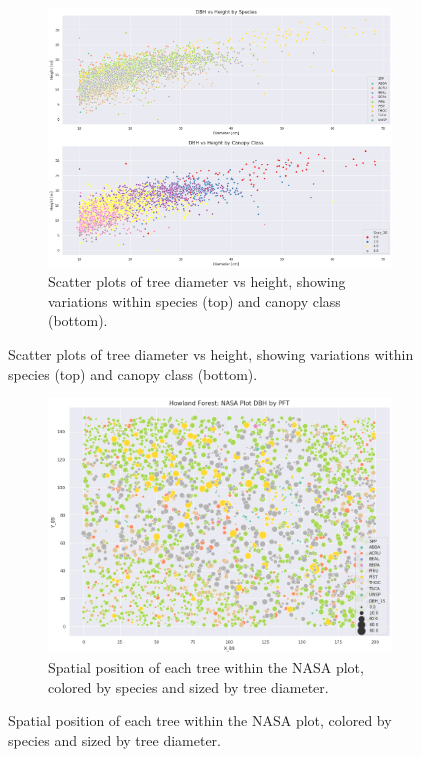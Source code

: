 \documentclass[12pt,a4paper]{article}
\begin{document}
\begin{figure}
\begin{figure}[H]
\centering
\includegraphics[scale=.55]{../figures/Eplot_Scatter_Height_vs_DBH_by_Cnpy&Species.png}
\caption{Scatter plots of tree diameter vs height, showing variations within species (top) and canopy class (bottom).}
\label{Eplot_Scatter_Height_vs_DBH_by_Cnpy&Species} 
\end{figure}
\end{figure}

\begin{figure}
\begin{figure}[H]
\centering
\includegraphics[scale=.75]{../figures/Eplot_TreeMap_bySpecies_byDBH.png}
\caption{Spatial position of each tree within the NASA plot, colored by species and sized by tree diameter.}
\label{Eplot_TreeMap_bySpecies_byDBH} 
\end{figure}
\end{figure}
\end{document}
